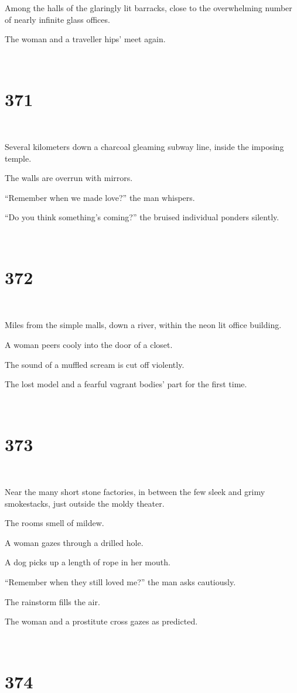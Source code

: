 \documentclass{report}
\begin{document}
Among the halls of the glaringly lit barracks, close to the overwhelming number of nearly infinite glass offices.

The woman and a traveller hips' meet again.

~
\chapter*{371}
~

Several kilometers down a charcoal gleaming subway line, inside the imposing temple.

The walls are overrun with mirrors.

``Remember when we made love?'' the man whispers.

``Do you think something's coming?'' the bruised individual ponders silently.

~
\chapter*{372}
~

Miles from the simple malls, down a river, within the neon lit office building.

A woman peers cooly into the door of a closet.

The sound of a muffled scream is cut off violently.

The lost model and a fearful vagrant bodies' part for the first time.

~
\chapter*{373}
~

Near the many short stone factories, in between the few sleek and grimy smokestacks, just outside the moldy theater.

The rooms smell of mildew.

A woman gazes through a drilled hole.

A dog picks up a length of rope in her mouth.

``Remember when they still loved me?'' the man asks cautiously.

The rainstorm fills the air.

The woman and a prostitute cross gazes as predicted.

~
\chapter*{374}
~
\end{document}
